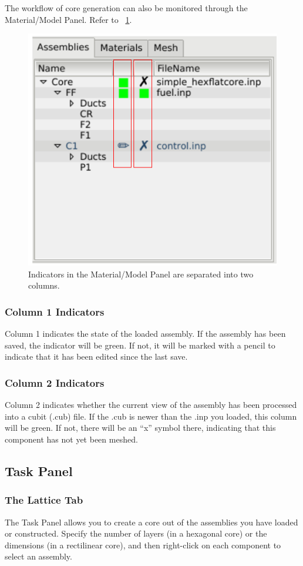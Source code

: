 The workflow of core generation can also be monitored through the Material/Model Panel.  Refer to ~\ref{fig:mmpanel1}.
\begin{figure}[!htb]
\begin{center}
\includegraphics[width=0.6\linewidth]{Images/material-model-panel-labeled-e1.png}
\caption{Indicators in the Material/Model Panel are separated into two columns.}
\label{fig:mmpanel1}
\end{center}
\end{figure}


\subsubsection{Column 1 Indicators}
Column 1 indicates the state of the loaded assembly.  If the assembly has been saved, the indicator will be green.  If not, it will be marked with a pencil to indicate that it has been edited since the last save.

\subsubsection{Column 2 Indicators}
Column 2 indicates whether the current view of the assembly has been processed into a cubit (.cub) file.  If the .cub is newer than the .inp you loaded, this column will be green.  If not, there will be an ``x'' symbol there, indicating that this component has not yet been meshed.

\subsection{Task Panel}
\subsubsection{The Lattice Tab}
The Task Panel allows you to create a core out of the assemblies you have loaded or constructed.  Specify the number of layers (in a hexagonal core) or the dimensions (in a rectilinear core), and then right-click on each component to select an assembly.

